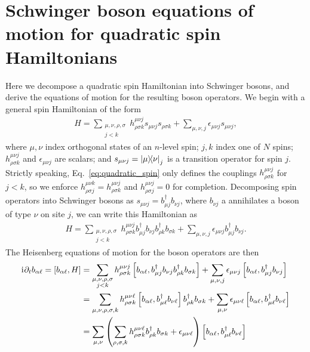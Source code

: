 \documentclass[nofootinbib,twocolumn]{revtex4-2}
\newcommand{\p}[1]{\left(#1\right)} %
\renewcommand{\sp}[1]{\left[#1\right]} %
\renewcommand{\d}{\partial} %
\renewcommand{\i}{\mathrm{i}\mkern1mu} %
\newcommand{\1}{\mathds{1}}
\begin{document}
\section{Schwinger boson equations of motion for quadratic spin Hamiltonians}
\label{sec:bosons}

Here we decompose a quadratic spin Hamiltonian into Schwinger bosons, and derive the equations of motion for the resulting boson operators.
We begin with a general spin Hamiltonian of the form
\begin{align}
  H = \sum_{\substack{\mu,\nu,\rho,\sigma\\j<k}}
  h^{\mu\nu j}_{\rho\sigma k} s_{\mu\nu j} s_{\rho\sigma k}
  + \sum_{\mu,\nu,j} \epsilon_{\mu\nu j} s_{\mu\nu j},
  \label{eq:quadratic_spin}
\end{align}
where $\mu,\nu$ index orthogonal states of an $n$-level spin; $j,k$ index one of $N$ spins; $h^{\mu\nu j}_{\rho\sigma k}$ and $\epsilon_{\mu\nu j}$ are scalars; and $s_{\mu\nu j}=\op{\mu}{\nu}_j$ is a transition operator for spin $j$.
Strictly speaking, Eq.~\eqref{eq:quadratic_spin} only defines the couplings $h^{\mu\nu j}_{\rho\sigma k}$ for $j<k$, so we enforce $h^{\mu\nu k}_{\rho\sigma j}=h^{\mu\nu j}_{\rho\sigma k}$ and $h^{\mu\nu j}_{\rho\sigma j}=0$ for completion.
Decomposing spin operators into Schwinger bosons as $s_{\mu\nu j}=b_{\mu j}^\dag b_{\nu j}$, where $b_{\nu j}$ a annihilates a boson of type $\nu$ on site $j$, we can write this Hamiltonian as
\begin{align}
  H = \sum_{\substack{\mu,\nu,\rho,\sigma\\j<k}}
  h^{\mu\nu j}_{\rho\sigma k}
  b_{\mu j}^\dag b_{\nu j} b_{\rho k}^\dag b_{\sigma k}
  + \sum_{\mu,\nu,j} \epsilon_{\mu\nu j} b_{\mu j}^\dag b_{\nu j}.
\end{align}
The Heisenberg equations of motion for the boson operators are then
\begin{align}
  \i \d_t b_{\alpha\ell} = \sp{b_{\alpha\ell}, H}
  &= \sum_{\substack{\mu,\nu,\rho,\sigma\\j<k}}
  h^{\mu\nu j}_{\rho\sigma k}
  \sp{b_{\alpha\ell}, b_{\mu j}^\dag b_{\nu j} b_{\rho k}^\dag b_{\sigma k}}
  + \sum_{\mu,\nu,j} \epsilon_{\mu\nu j}
  \sp{b_{\alpha\ell}, b_{\mu j}^\dag b_{\nu j}} \\
  &= \sum_{\mu,\nu,\rho,\sigma,k} h^{\mu\nu\ell}_{\rho\sigma k}
  \sp{b_{\alpha\ell}, b_{\mu\ell}^\dag b_{\nu\ell}}
  b_{\rho k}^\dag b_{\sigma k}
  + \sum_{\mu,\nu} \epsilon_{\mu\nu\ell}
  \sp{b_{\alpha\ell}, b_{\mu\ell}^\dag b_{\nu\ell}} \\
  &= \sum_{\mu,\nu} \p{\sum_{\rho,\sigma,k}
    h^{\mu\nu\ell}_{\rho\sigma k} b_{\rho k}^\dag b_{\sigma k}
    + \epsilon_{\mu\nu\ell}}
  \sp{b_{\alpha\ell}, b_{\mu\ell}^\dag b_{\nu\ell}}
\end{align}
\end{document}
